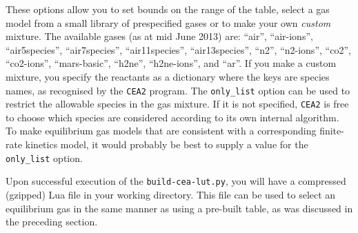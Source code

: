 \medskip
These options allow you to set bounds on the range of the table,
select a gas model from a small library of prespecified gases or
to make your own \textit{custom} mixture.
The available gases (as at mid June 2013) are:
   ``air'',
   ``air-ions'',
   ``air5species'',
   ``air7species'',
   ``air11species'',
   ``air13species'',
   ``n2'',
   ``n2-ions'',
   ``co2'',
   ``co2-ions'',
   ``mars-basic'',
   ``h2ne'',
   ``h2ne-ions'', and
   ``ar''.
If you make a custom mixture, you specify the reactants as a dictionary where the keys are
species names, as recognised by the \verb!CEA2! program.
The \verb!only_list! option can be used to restrict the allowable species in the gas mixture.
If it is not specified, \verb!CEA2! is free to choose which species are considered according to its
own internal algorithm.
To make equilibrium gas models that are consistent with a corresponding finite-rate kinetics model,
it would probably be best to supply a value for the \verb!only_list! option.

\medskip
Upon successful execution of the \texttt{build-cea-lut.py}, you will have a compressed (gzipped)
Lua file in your working directory.
This file can be used to select an equilibrium gas in the
same manner as using a pre-built table, as was discussed in the preceding section. 

